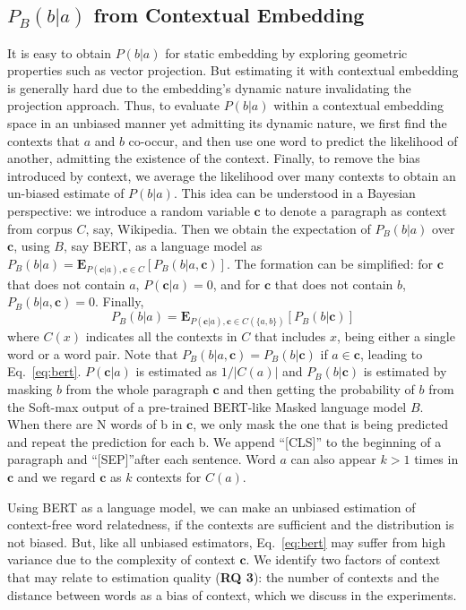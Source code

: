 \documentclass[letterpaper]{article} %
\begin{document}
\subsection{$P_B(b|a)$ from Contextual Embedding} 
It is easy to obtain $P(b|a)$ for static embedding by exploring geometric properties such as vector projection. But estimating it with contextual embedding is generally hard due to the embedding's dynamic nature invalidating the projection approach. 
Thus, to evaluate $P(b|a)$ within a contextual embedding space in an unbiased manner yet admitting its dynamic nature, we first find the contexts that $a$ and $b$ co-occur, and then use one word to predict the likelihood of another, admitting the existence of the context. Finally, to remove the bias introduced by context, we average the likelihood over many contexts to obtain an un-biased estimate of $P(b|a)$. This idea can be understood in a Bayesian perspective: we introduce a random variable $\textbf{c}$ to denote a paragraph as context from corpus $C$, say, Wikipedia. Then we obtain the expectation of $P_B(b|a)$ over $\mathbf{c}$, using $B$, say BERT, as a language model as $P_B(b|a)= \mathbf{E}_{P(\mathbf{c}|a), \mathbf{c} \in C} [P_B(b|a,\mathbf{c})]$. The formation can be simplified: for $\textbf{c}$ that does not contain $a$, $P(\textbf{c}|a)=0$, and for $\textbf{c}$ that does not contain $b$, $P_B(b|a,\textbf{c})=0$. Finally,
\begin{equation} \label{eq:bert}
    P_B(b|a)=\mathbf{E}_{P(\mathbf{c}|a), \mathbf{c} \in C(\{a,b\})} [P_B(b|\mathbf{c})]
\end{equation}
where $C(x)$ indicates all the contexts in $C$ that includes $x$, being either a single word or a word pair. Note that $P_B(b|a,\mathbf{c})=P_B(b|\mathbf{c})$ if $a\in \mathbf{c}$, leading to Eq.~\ref{eq:bert}. $P(\textbf{c}|a)$ is estimated as $1/|C(a)|$ and $P_B(b|\textbf{c})$ is estimated by masking $b$ from the whole paragraph $\textbf{c}$ and then getting the probability of $b$ from the Soft-max output of a pre-trained BERT-like Masked language model $B$. When there are N words of b in $\mathbf{c}$, we only mask the one that is being predicted and repeat the prediction for each b. We append ``[CLS]'' to the beginning of a paragraph and ``[SEP]''after each sentence. Word $a$ can also appear $k>1$ times in $\mathbf{c}$ and we regard $\mathbf{c}$ as $k$ contexts for $C(a)$. 

Using BERT as a language model, we can make an unbiased estimation of context-free word relatedness, if the contexts are sufficient and the distribution is not biased. But, like all unbiased estimators, Eq.~\ref{eq:bert} may suffer from high variance due to the complexity of context $\textbf{c}$. We identify two factors of context that may relate to estimation quality (\textbf{RQ 3}): the number of contexts and the distance between words as a bias of context, which we discuss in the experiments.
\end{document}
